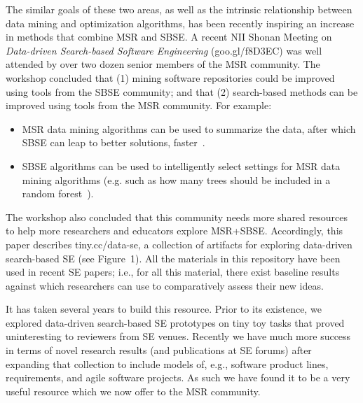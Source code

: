 \documentclass[sigconf,anonymous,review]{acmart}
\newcommand\TODO[1]{\textcolor{ScarletRed}{\textbf{\colorbox{yellow}{\small TODO:}} \emph{#1}}\xspace}
\begin{document}
{The similar goals of these two areas, as well as the intrinsic relationship between data mining and optimization algorithms, has been recently inspiring an} increase in methods that combine MSR and SBSE.
A recent {NII Shonan Meeting}  on {\em Data-driven Search-based Software
Engineering} (goo.gl/f8D3EC)   was well attended by over two dozen senior members of the MSR community.
The workshop concluded that (1) mining software repositories could be improved using {tools from the SBSE community}; and that (2) search-based methods can be improved using tools from the MSR community. 
For example:
\begin{itemize}[leftmargin=*]
\item
MSR data mining algorithms can be used to summarize the data, after which SBSE can leap to better solutions, faster~\cite{krall2015gale}.
\item
SBSE {algorithms} can be used to intelligently select 
settings for MSR data mining algorithms (e.g.
such as how many trees should be included in a random
forest~\cite{fu2016tuning}).
\end{itemize}
The workshop also concluded that this community needs more shared  resources 
to help more researchers and educators explore MSR+SBSE.
Accordingly, this paper describes  tiny.cc/data-se,
a collection of artifacts for exploring
data-driven search-based SE (see Figure~1). 
All the materials in this repository
have been used in recent SE papers; i.e., for all this material, there exist baseline results against which researchers can use to comparatively assess their new ideas.

It has taken several years to build this resource. Prior to its
existence, we explored data-driven search-based SE
prototypes on tiny toy tasks that proved 
uninteresting to 
 reviewers from SE venues. 
Recently we have much more success in terms of novel
research results
(and publications at SE forums) after 
expanding that collection
to include models
of, e.g., software product lines, requirements, and
agile software projects. 
As such we have found it to be a very useful resource
which we now offer to the MSR community.






\end{document}
